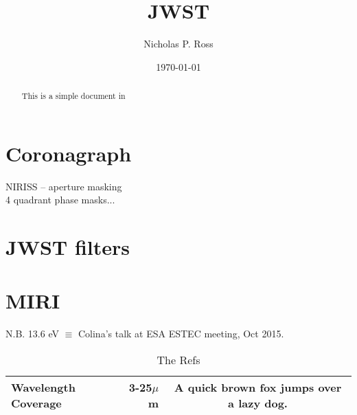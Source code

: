 \documentclass[11pt]{article}
\begin{document}
\title{JWST}
\author{Nicholas P. Ross}
\date{\today}
\maketitle


\begin{abstract}
This is a simple document in 
\end{abstract}


\section{Coronagraph}

NIRISS -- aperture masking\\
4 quadrant phase masks...\\

\section{JWST filters}


\section{MIRI}
\citet{Croom04}
\noindent
N.B. 13.6 eV $\equiv$
Colina's talk at ESA ESTEC meeting, Oct 2015. 

\begin{table}
  \caption{The Refs}
  \label{tab:the_ref}
  \begin{center}
    \begin{tabular}{l r c }
      \hline
      \hline 
    Wavelength Coverage            & 3-25$\mu$m  & A quick brown fox jumps over a lazy dog. \\
      \hline
      \hline
    \end{tabular}
  \end{center}
\end{table}



\end{document}
